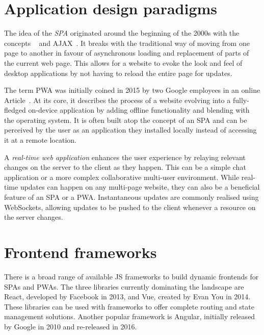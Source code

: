 \section{Application design paradigms}
\label{sec:application-design-paradigms}

The idea of the \emph{\ac{SPA}} originated around the beginning of the 2000s with the concepts ~\parencite{innerBrowsing} and \ac{AJAX}~\parencite{ajaxNewApproach}.
It breaks with the traditional way of moving from one page to another in favour of asynchronous loading and replacement of parts of the current web page.
This allows for a website to evoke the look and feel of desktop applications by not having to reload the entire page for updates.

The term \ac{PWA} was initially coined in 2015 by two Google employees in an online Article~\parencite{progressiveWebApplications}.
At its core, it describes the process of a website  evolving into a fully-fledged on-device application by adding offline functionality and blending with the operating system.
It is often built atop the concept of an \ac{SPA} and can be perceived by the user as an application they installed locally instead of accessing it at a remote location.

A \emph{real-time web application} enhances the user experience by relaying relevant changes on the server to the client as they happen.
This can be a simple chat application or a more complex collaborative multi-user environment.
While real-time updates can happen on any multi-page website, they can also be a beneficial feature of an \ac{SPA} or a \ac{PWA}.
Instantaneous updates are commonly realised using WebSockets, allowing updates to be pushed to the client whenever a resource on the server changes.

\section{Frontend frameworks}
\label{sec:frontend-frameworks}

There is a broad range of available \ac{JS} frameworks to build dynamic frontends for \ac{SPA}s and \ac{PWA}s. The three libraries currently dominating the landscape are React, developed by Facebook in 2013, and Vue, created by Evan You in 2014.
These libraries can be used with frameworks to offer complete routing and state management solutions.
Another popular framework is Angular, initially released by Google in 2010 and re-released in 2016.

